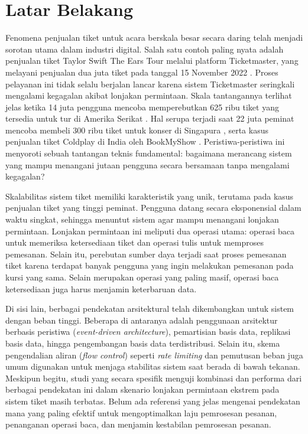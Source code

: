 \section{Latar Belakang}
\label{sec:latar-belakang}

Fenomena penjualan tiket untuk acara berskala besar secara daring telah menjadi sorotan utama dalam industri digital. Salah satu contoh paling nyata adalah penjualan tiket Taylor Swift The Ears Tour melalui platform Ticketmaster, yang melayani penjualan dua juta tiket pada tanggal 15 November 2022 \parencite{swiftTicketmaster}. Proses pelayanan ini tidak selalu berjalan lancar karena sistem Ticketmaster seringkali mengalami kegagalan akibat lonjakan permintaan. Skala tantangannya terlihat jelas ketika 14 juta pengguna mencoba memperebutkan 625 ribu tiket yang tersedia untuk tur di Amerika Serikat \parencite{USTaylorSwift}. Hal serupa terjadi saat 22 juta peminat mencoba membeli 300 ribu tiket untuk konser di Singapura \parencite{asiaTaylorSwift}, serta kasus penjualan tiket Coldplay di India oleh BookMyShow \parencite{coldplayBookMyShow}. Peristiwa-peristiwa ini menyoroti sebuah tantangan teknis fundamental: bagaimana merancang sistem yang mampu menangani jutaan pengguna secara bersamaan tanpa mengalami kegagalan?

Skalabilitas sistem tiket memiliki karakteristik yang unik, terutama pada kasus penjualan tiket yang tinggi peminat. Pengguna datang secara eksponensial dalam waktu singkat, sehingga menuntut sistem agar mampu menangani lonjakan permintaan. Lonjakan permintaan ini meliputi dua operasi utama: operasi baca untuk memeriksa ketersediaan tiket dan operasi tulis untuk memproses pemesanan. Selain itu, perebutan sumber daya terjadi saat proses pemesanan tiket karena terdapat banyak pengguna yang ingin melakukan pemesanan pada kursi yang sama. Selain merupakan operasi yang paling masif, operasi baca ketersediaan juga harus menjamin keterbaruan data.

Di sisi lain, berbagai pendekatan arsitektural telah dikembangkan untuk sistem dengan beban tinggi. Beberapa di antaranya adalah penggunaan arsitektur berbasis peristiwa (\textit{event-driven architecture}), pemartisian basis data, replikasi basis data, hingga pengembangan basis data terdistribusi. Selain itu, skema pengendalian aliran (\textit{flow control}) seperti \textit{rate limiting} dan pemutusan beban juga umum digunakan untuk menjaga stabilitas sistem saat berada di bawah tekanan. Meskipun begitu, studi yang secara spesifik menguji kombinasi dan performa dari berbagai pendekatan ini dalam skenario lonjakan permintaan ekstrem pada sistem tiket masih terbatas. Belum ada referensi yang jelas mengenai pendekatan mana yang paling efektif untuk mengoptimalkan laju pemrosesan pesanan, penanganan operasi baca, dan menjamin kestabilan pemrosesan pesanan.

